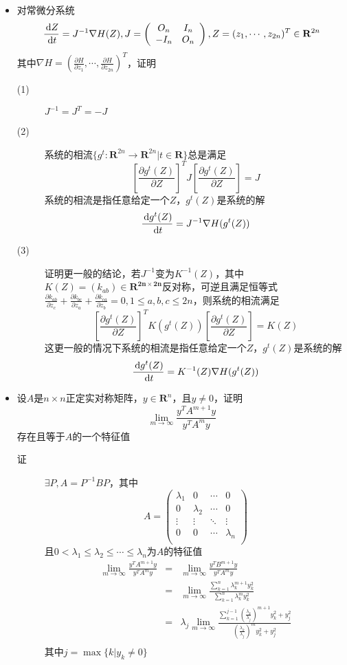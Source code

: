 \begin{itemize}
\item 对常微分系统
\[
\frac{\,\mathrm{d} Z}{\,\mathrm{d} t}=J^{-1}\nabla H(Z),
J=\left(
\begin{array}{cc}
O_n & I_n \\
-I_n & O_n \\
\end{array}
\right),
Z=(z_1,\cdots,z_{2n})^T\in \mathbf{R}^{2n}
\]
其中$\nabla H =(\frac{\partial H}{\partial z_1},\cdots,\frac{\partial H}{\partial z_{2n}})^T$，证明
\begin{description}
\item[(1)] $J^{-1}=J^T=-J$
\item[(2)] 系统的相流$\{g^t:\mathbf{R}^{2n} \to \mathbf{R}^{2n}|t \in \mathbf{R}\}$总是满足
\[
\left[\frac{\partial g^t(Z)}{\partial Z}\right]^T J \left[\frac{\partial g^t(Z)}{\partial Z}\right] = J
\]
系统的相流是指任意给定一个$Z$，$g^t(Z)$是系统的解
\[
\frac{\,\mathrm{d} g^t(Z)}{\,\mathrm{d} t}=J^{-1}\nabla H(g^t(Z))
\]
\item[(3)] 证明更一般的结论，若$J^{-1}$变为$K^{-1}(Z)$，其中$K(Z)=(k_{ab})\in \mathbf{R^{2n\times 2n}}$反对称，可逆且满足恒等式$\frac{\partial k_{ab}}{\partial z_c}+\frac{\partial k_{bc}}{\partial z_a}+\frac{\partial k_{ca}}{\partial z_b}=0,1\leq a,b,c\leq 2n$，则系统的相流满足
\[
\left[\frac{\partial g^t(Z)}{\partial Z}\right]^T K(g^t(Z)) \left[\frac{\partial g^t(Z)}{\partial Z}\right] = K(Z)
\]
这更一般的情况下系统的相流是指任意给定一个$Z$，$g^t(Z)$是系统的解
\[
\frac{\,\mathrm{d} g^t(Z)}{\,\mathrm{d} t}=K^{-1}(Z)\nabla H(g^t(Z))
\]
\end{description}

\item 设$A$是$n \times n$正定实对称矩阵，$y\in \mathbf{R}^n$，且$y\neq 0$，证明
\[
\lim_{m \to \infty}\frac{y^TA^{m+1}y}{y^TA^my}
\]
存在且等于$A$的一个特征值
\begin{description}
\item[证] $\exists P,A=P^{-1}BP$，其中
\[
A=\left(
\begin{array}{cccc}
\lambda_1 & 0 & \cdots & 0 \\
0 & \lambda_2 & \cdots & 0 \\
\vdots & \vdots & \ddots & \vdots \\
0 & 0 & \cdots & \lambda_n\\
\end{array}
\right)
\]
且$0<\lambda_1\leq \lambda_2 \leq \cdots \leq \lambda_n$为$A$的特征值
\begin{eqnarray*}
\lim_{m \to \infty}\frac{y^TA^{m+1}y}{y^TA^my} & =& \lim_{m \to \infty}\frac{y^TB^{m+1}y}{y^TA^my}\\
& =& \lim_{m \to \infty}\frac{\sum_{k=1}^n \lambda_k^{m+1}y_k^2}{\sum_{k=1}^n \lambda_k^{m}y_k^2}\\
& =& \lambda_j \lim_{m \to \infty}\frac{\sum_{k=1}^{j-1} (\frac{\lambda_k}{\lambda_j})^{m+1}y_k^2+y_j^2}{(\frac{\lambda_k}{\lambda_j})^my_k^2+y_j^2}\\
\end{eqnarray*}
其中$j=\max\{k|y_k\neq 0\}$
\end{description}


\end{itemize}
